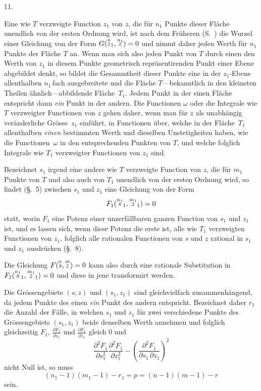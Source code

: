 \documentclass[a4paper,12pt,leqno]{article}
\begin{document}
\medbreak

\centerline{11.}

\nobreak\medskip

Eine wie $T$ verzweigte Function $z_1$ von $z$, die f\"{u}r $n_1$
Punkte dieser Fl\"{a}che unendlich von der ersten Ordnung wird,
ist nach dem Fr\"{u}heren (S.~\pageref{`Wurzel'}) die Wurzel einer
Gleichung von der Form
$G( {\buildrel n \over z_1}, {\buildrel n_1 \over z} ) = 0$
und nimmt daher jeden Werth f\"{u}r $n_1$ Punkte der Fl\"{a}che
$T$ an.  Wenn man sich also jeden Punkt von $T$ durch einen den
Werth von $z_1$ in diesem Punkte geometrisch repr\"{a}sentirenden
Punkt einer Ebene abgebildet denkt, so bildet die Gesammtheit
dieser Punkte eine in der $z_1$-Ebene allenthalben $n_1 \,$\-fach
ausgebreitete und die Fl\"{a}che $T$---bekanntlich in den
kleinsten Theilen \"{a}hnlich---abbildende Fl\"{a}che~$T_1$.
Jedem Punkt in der einen Fl\"{a}che entspricht dann \emph{ein}
Punkt in der andern.  Die Functionen $\omega$ oder die Integrale
wie $T$ verzweigter Functionen von $z$ gehen daher, wenn man
f\"{u}r $z$ als unabh\"{a}ngig ver\"{a}nderliche Gr\"{o}sse~$z_1$
einf\"{u}hrt, in Functionen \"{u}ber, welche in der
Fl\"{a}che~$T_1$ allenthalben \emph{einen} bestimmten Werth und
dieselben Unstetigkeiten haben, wie die Functionen~$\omega$ in den
entsprechenden Punkten von $T$, und welche folglich Integrale wie
$T_1$ verzweigter Functionen von $z_1$ sind.

Bezeichnet $s_1$ irgend eine andere wie $T$ verzweigte Function
von $z$, die f\"{u}r $m_1$ Punkte von $T$ und also auch von $T_1$
unendlich von der ersten Ordnung wird, so findet (\S.~5) zwischen
$s_1$ und $z_1$ eine Gleichung von der Form
\[ F_1( {\buildrel n_1 \over s_1}, {\buildrel m_1 \over z_1} ) = 0 \]
statt, worin $F_1$ eine Potenz einer unzerf\"{a}llbaren ganzen
Function von $s_1$ und $z_1$ ist, und es lassen sich, wenn diese
Potenz die erste ist, alle wie $T_1$ verzweigten Functionen von
$z_1$, folglich alle rationalen Functionen von $s$ und $z$
rational in $s_1$ und $z_1$ ausdr\"{u}cken (\S.~8).

Die Gleichung
$F( {\buildrel n \over s}, {\buildrel m \over z} ) = 0$
kann also durch eine rationale Substitution in
$F_1( {\buildrel n_1 \over s_1}, {\buildrel m_1 \over z_1} ) = 0$
und diese in jene transformirt werden.

Die Gr\"{o}ssengebiete $(s,z)$ und $(s_1, z_1)$ sind
gleichvielfach zusammenh\"{a}ngend, da jedem Punkte des einen
\emph{ein} Punkt des andern entspricht.  Bezeichnet daher $r_1$
die Anzahl der F\"{a}lle, in welchen $s_1$ und $z_1$ f\"{u}r zwei
verschiedene Punkte des Gr\"{o}ssengebiets $(s_1, z_1)$ beide
denselben Werth annehmen und folglich gleichzeitig $F_1$,
$\displaystyle \frac{\partial F_1}{\partial s_1}$
und
$\displaystyle \frac{\partial F_1}{\partial z_1}$
gleich $0$ und
\[ \frac{\partial^2 F_1}{\partial s_1^2}
      \frac{\partial^2 F_1}{\partial z_1^2}
    - \left( \frac{\partial^2 F_1}{\partial s_1 \, \partial z_1} \right)^2 \]
nicht Null ist, so muss
\[ (n_1 - 1)(m_1 - 1) - r_1 = p = (n - 1)(m - 1) - r \]
sein.
\end{document}
